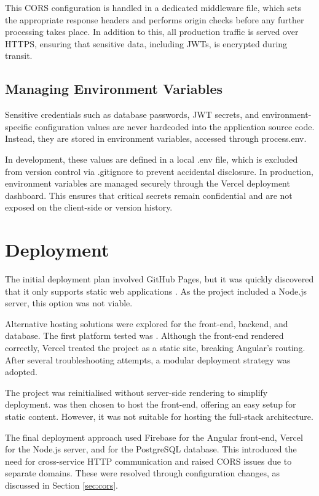 \documentclass{l4proj}
\begin{document}
This CORS configuration is handled in a dedicated middleware file, which sets the appropriate response headers and performs origin checks before any further processing takes place. In addition to this, all production traffic is served over HTTPS, ensuring that sensitive data, including JWTs, is encrypted during transit.


\subsection{Managing Environment Variables}
Sensitive credentials such as database passwords, JWT secrets, and environment-specific configuration values are never hardcoded into the application source code. Instead, they are stored in environment variables, accessed through process.env.

In development, these values are defined in a local .env file, which is excluded from version control via .gitignore to prevent accidental disclosure. In production, environment variables are managed securely through the Vercel deployment dashboard. This ensures that critical secrets remain confidential and are not exposed on the client-side or version history.



\section{Deployment}
The initial deployment plan involved GitHub Pages, but it was quickly discovered that it only supports static web applications \citep{github_about_pages}. As the project included a Node.js server, this option was not viable.

Alternative hosting solutions were explored for the front-end, backend, and database. The first platform tested was \citet{vercel_docs}. Although the front-end rendered correctly, Vercel treated the project as a static site, breaking Angular’s routing. After several troubleshooting attempts, a modular deployment strategy was adopted.

The project was reinitialised without server-side rendering to simplify deployment. \citet{firebase} was then chosen to host the front-end, offering an easy setup for static content. However, it was not suitable for hosting the full-stack architecture.

The final deployment approach used Firebase for the Angular front-end, Vercel for the Node.js server, and \citet{supabase} for the PostgreSQL database. This introduced the need for cross-service HTTP communication and raised CORS issues due to separate domains. These were resolved through configuration changes, as discussed in Section \ref{sec:cors}.
\end{document}
